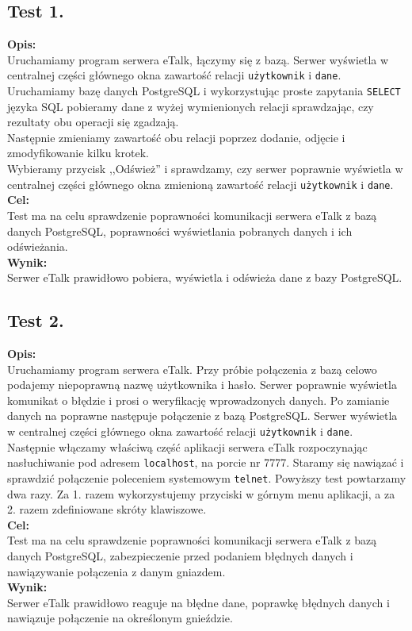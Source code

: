 \documentclass[a4paper,12pt]{article}
\begin{document}
\subsection[Test 1.]{Test 1.}
\textbf{Opis:}\\
Uruchamiamy program serwera eTalk, łączymy się z bazą. Serwer wyświetla w centralnej części głównego okna zawartość relacji \texttt{użytkownik} i \texttt{dane}.\\
Uruchamiamy bazę danych PostgreSQL i wykorzystując proste zapytania \texttt{SELECT} języka SQL pobieramy dane z wyżej wymienionych relacji sprawdzając, czy rezultaty obu operacji się zgadzają.\\
Następnie zmieniamy zawartość obu relacji poprzez dodanie, odjęcie i zmodyfikowanie kilku krotek.\\
Wybieramy przycisk ,,Odśwież'' i sprawdzamy, czy serwer poprawnie wyświetla w centralnej części głównego okna zmienioną zawartość relacji \texttt{użytkownik} i \texttt{dane}.\\
\textbf{Cel:}\\
Test ma na celu sprawdzenie poprawności komunikacji serwera eTalk z bazą danych PostgreSQL, poprawności wyświetlania pobranych danych i ich odświeżania.\\
\textbf{Wynik:}\\
Serwer eTalk prawidłowo pobiera, wyświetla i odświeża dane z bazy PostgreSQL.

\subsection[Test 2.]{Test 2.}
\textbf{Opis:}\\
Uruchamiamy program serwera eTalk.
Przy próbie połączenia z bazą celowo podajemy niepoprawną nazwę użytkownika i hasło. Serwer poprawnie wyświetla komunikat o błędzie i prosi o weryfikację wprowadzonych danych. Po zamianie danych na poprawne następuje połączenie z bazą PostgreSQL.
Serwer wyświetla w centralnej części głównego okna zawartość relacji \texttt{użytkownik} i \texttt{dane}.\\
Następnie włączamy właściwą część aplikacji serwera eTalk rozpoczynając nasłuchiwanie pod adresem \texttt{localhost}, na porcie nr 7777.
Staramy się nawiązać i sprawdzić połączenie poleceniem systemowym \texttt{telnet}.
Powyższy test powtarzamy dwa razy. Za 1. razem wykorzystujemy przyciski w górnym menu aplikacji, a za 2. razem zdefiniowane skróty klawiszowe. \\
\textbf{Cel:}\\
Test ma na celu sprawdzenie poprawności komunikacji serwera eTalk z bazą danych PostgreSQL, zabezpieczenie przed podaniem błędnych danych i nawiązywanie połączenia z danym gniazdem.\\
\textbf{Wynik:}\\
Serwer eTalk prawidłowo reaguje na błędne dane, poprawkę błędnych danych i nawiązuje połączenie na określonym gnieździe.
\end{document}
